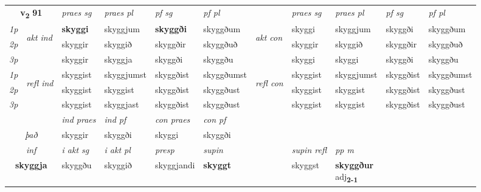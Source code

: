 \noindent
\begin{tabular}{lllllllllll} \toprule
\multicolumn{2}{c}{\textbf{v{\textsubscript{2}}} \Large{\textbf{91}}}  &  \textit{praes sg}  & \textit{praes pl}  &\textit{ pf sg} & \textit{pf pl} &  &  \textit{praes sg}  & \textit{praes pl}  & \textit{pf sg} & \textit{pf pl } \\*
	\cmidrule{3-6} \cmidrule{8-11}
 {\textit{1p}} & \multirow{3}{*}{\begin{turn}{90}\textit{akt ind}\end{turn}} & \textbf{skyggi} & skyggjum & \textbf{skyggði} & skyggðum & \multirow{3}{*}{\begin{turn}{90}\textit{akt con}\end{turn}} &skyggi & skyggjum & skyggði & skyggðum\\*
 {\textit{2p}} &  &  skyggir  & skyggið & skyggðir & skyggðuð & & skyggir & skyggið & skyggðir & skyggðuð \\*
{\textit{3p}} &  & skyggir & skyggja & skyggði & skyggðu & & skyggi & skyggi& skyggði & skyggðu \\*
\cmidrule{3-6} \cmidrule{8-11}
 {\textit{1p}} & \multirow{3}{*}{\begin{turn}{90}\textit{refl ind}\end{turn}}  & skyggist & skyggjumst & skyggðist & skyggðumst & \multirow{3}{*}{\begin{turn}{90}\textit{refl con}\end{turn}}  &skyggist & skyggjumst & skyggðist & skyggðumst \\*
 {\textit{2p}} &  & skyggist & skyggist & skyggðist & skyggðust & &skyggist & skyggist & skyggðist & skyggðust \\*
 {\textit{3p}}  & & skyggist & skyggjast & skyggðist & skyggðust & & skyggist & skyggist& skyggðist & skyggðust \\*
\cmidrule{3-6} \cmidrule{8-11}

   & &  \textit{ind praes} & \textit{ind pf} & \textit{con praes} & \textit{con pf} \\*
\multicolumn{2}{c}{ \textit{það} } & skyggir & skyggði & skyggi & skyggði \\*

\cmidrule{3-9}
   \multicolumn{2}{c}{\textit{inf}}  & \textit{i akt sg} & \textit{i akt pl}   & \textit{presp} & \textit{supin} && \textit{supin refl} & \textit{pp m} \\*
  \multicolumn{2}{c}{\textbf{skyggja}} & skyggðu  & skyggið   & skyggjandi &  \textbf{skyggt} && skyggst & \specialcell{\textbf{skyggður} \\ adj\textbf{\textsubscript{2-1}}} \\*
\end{tabular}

